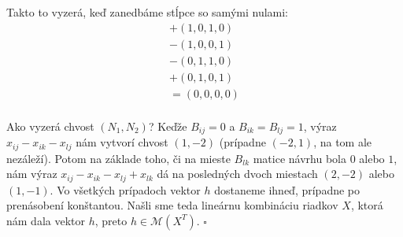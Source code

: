 \begin{dokaz}
Takto to vyzerá, keď zanedbáme stĺpce so samými nulami:
\[
\begin{split}
+(1, 0, 1, 0) \\
-(1, 0, 0, 1) \\
-(0, 1, 1, 0) \\
+(0, 1, 0, 1) \\
=(0, 0, 0, 0) \\
\end{split}
\]

Ako vyzerá chvost $(N_1, N_2)$? Keďže $B_{ij} = 0$ a $B_{ik} = B_{lj} = 1$,
výraz $x_{ij} - x_{ik} - x_{lj}$ nám vytvorí chvost $(1, -2)$ (prípadne $(-2, 1)$, na tom ale nezáleží).
Potom na základe toho, či na mieste $B_{lk}$ matice návrhu bola $0$ alebo $1$,
nám výraz $x_{ij} - x_{ik} - x_{lj} + x_{lk}$ dá na posledných dvoch miestach $(2, -2)$ alebo $(1, -1)$.
Vo všetkých prípadoch vektor $h$ dostaneme ihneď, prípadne po prenásobení konštantou.
Našli sme teda lineárnu kombináciu riadkov $X$, ktorá nám dala vektor $h$, preto $h \in \mathcal{M}(X^T)$. $\square$

\end{dokaz}
